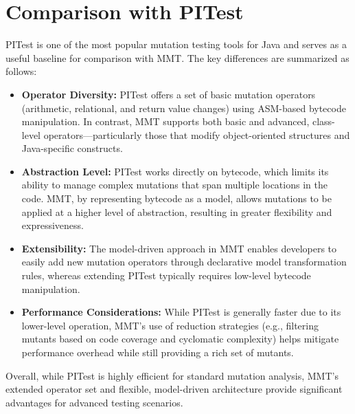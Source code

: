 \documentclass[sigplan, nonacm]{acmart}
\begin{document}
\section{Comparison with PITest}
\label{sec:comparison}
PITest is one of the most popular mutation testing tools for Java and serves as a useful baseline for comparison with MMT. The key differences are summarized as follows:
\begin{itemize}[noitemsep]
	\item \textbf{Operator Diversity:} PITest offers a set of basic mutation operators (arithmetic, relational, and return value changes) using ASM-based bytecode manipulation. In contrast, MMT supports both basic and advanced, class-level operators—particularly those that modify object-oriented structures and Java-specific constructs.
	\item \textbf{Abstraction Level:} PITest works directly on bytecode, which limits its ability to manage complex mutations that span multiple locations in the code. MMT, by representing bytecode as a model, allows mutations to be applied at a higher level of abstraction, resulting in greater flexibility and expressiveness.
	\item \textbf{Extensibility:} The model-driven approach in MMT enables developers to easily add new mutation operators through declarative model transformation rules, whereas extending PITest typically requires low-level bytecode mani\-pulation.
	\item \textbf{Performance Considerations:} While PITest is generally faster due to its lower-level operation, MMT’s use of reduction strategies (e.g., filtering mutants based on code coverage and cyclomatic complexity) helps mitigate performance overhead while still providing a rich set of mutants.
\end{itemize}
Overall, while PITest is highly efficient for standard mutation analysis, MMT’s extended operator set and flexible, model-driven architecture provide significant advantages for advanced testing scenarios.
\end{document}
